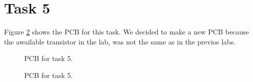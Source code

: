 \documentclass[a4paper,english,11pt]{article}
\begin{document}
\section{Task 5}
Figure \ref{fig:pcb} shows the PCB for this task. We decided to make a new PCB because the awailable transistor in the lab, was not the same as in the previos labs.
\begin{figure}[!htbp]
 \centering
  \caption{PCB for task 5.}
  \label{fig:pcb}	
\end{figure}
\begin{figure}[!htbp]
 \centering
  \caption{PCB for task 5.}
  \label{fig:pcb}	
\end{figure}
\end{document}
